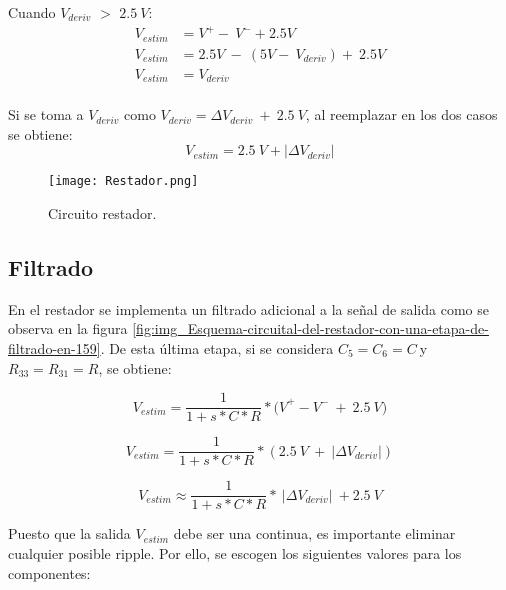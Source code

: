 \noindent Cuando $V_{deriv}$ $\mathrm{>}$ $2.5\:V$: 
\begin{equation*} 
	\begin{aligned}
		V_{estim}&=V^+-\ V^-+2.5V\\ 
		V_{estim}&=2.5V\ -\ (5V-\ V_{deriv})+\ 2.5V\\
		V_{estim}&=V_{deriv}\\
	\end{aligned}
\end{equation*}

\noindent Si se toma a $V_{deriv}$ como $V_{deriv}=\mathit{\Delta}V_{deriv}\ +\ 2.5\: V$, al reemplazar en los dos casos se obtiene:
\begin{equation} \label{eq_rest_3}
	V_{estim}= 2.5\:V + |\mathit{\Delta}V_{deriv}|
\end{equation}

\begin{figure}[H]
	\centering
	\texttt{[image: Restador.png]}
	\caption{Circuito restador.}
	\label{fig:img_Restador}
\end{figure}

\subsection{Filtrado}

\noindent En el restador se implementa un filtrado adicional a la se\~{n}al de salida como se observa en la figura  \ref{fig:img_Esquema-circuital-del-restador-con-una-etapa-de-filtrado-en-159}. De esta \'{u}ltima etapa, si se considera $C_5=C_6=C\ $y $R_{33}=R_{31}=R$, se obtiene:



\begin{equation}
	V_{estim}=\frac{1}{1+s*C*R}*{(V}^+-V^-\ +\ 2.5\:V)
\end{equation}

\begin{equation} \label{eq_Vestim_1}
	V_{estim}=\frac{1}{1+s*C*R}*(2.5\: V\ +\ |\mathit{\Delta}V_{deriv}|)
\end{equation}

\begin{equation} \label{eq_Vestim_2}
	V_{estim} \approx \frac{1}{1+s*C*R}*\ |\mathit{\Delta}V_{deriv}|\ +2.5\:V
\end{equation}



\noindent Puesto que la salida $V_{estim}$ debe ser una continua, es importante eliminar cualquier posible ripple. Por ello, se escogen los siguientes valores para los componentes:


